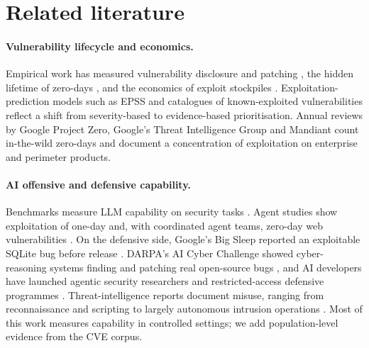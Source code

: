 \documentclass[11pt,a4paper]{article}
\begin{document}
\section{Related literature}\label{sec:related}

\paragraph{Vulnerability lifecycle and economics.} Empirical work has measured vulnerability disclosure and patching \citep{frei2006large,arora2010empirical}, the hidden lifetime of zero-days \citep{bilge2012before}, and the economics of exploit stockpiles \citep{ablon2017zero}. Exploitation-prediction models such as EPSS \citep{jacobs2021epss} and catalogues of known-exploited vulnerabilities \citep{cisa2021bod} reflect a shift from severity-based to evidence-based prioritisation. Annual reviews by Google Project Zero, Google's Threat Intelligence Group and Mandiant count in-the-wild zero-days \citep{stone2022review,mandiant2023zeroday,google2024zeroday,gtig2025zeroday} and document a concentration of exploitation on enterprise and perimeter products.

\paragraph{AI offensive and defensive capability.} Benchmarks measure LLM capability on security tasks \citep{bhatt2023purple,zhang2024cybench,zhu2025cvebench}. Agent studies show exploitation of one-day \citep{fang2024oneday} and, with coordinated agent teams, zero-day web vulnerabilities \citep{zhu2024teams}. On the defensive side, Google's Big Sleep reported an exploitable SQLite bug before release \citep{bigsleep2024}. DARPA's AI Cyber Challenge showed cyber-reasoning systems finding and patching real open-source bugs \citep{darpa2025aixcc}, and AI developers have launched agentic security researchers \citep{openai2025aardvark,deepmind2025codemender} and restricted-access defensive programmes \citep{anthropic2026glasswing}. Threat-intelligence reports document misuse, ranging from reconnaissance and scripting \citep{microsoft2024threat} to largely autonomous intrusion operations \citep{anthropic2025espionage}. Most of this work measures capability in controlled settings; we add population-level evidence from the CVE corpus.
\end{document}
